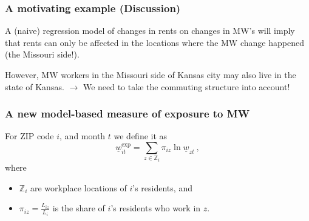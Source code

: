 \documentclass[aspectratio=169, t]{beamer}
\newcommand{\MW}{\underline{w}}
\begin{document}
\begin{frame}
    \frametitle{A motivating example (Discussion)}
    A (naive) regression model of changes in rents on changes in MW's will imply that rents can only be affected 
    in the locations where the MW change happened (the Missouri side!). 
    
    \pause
    \vspace{3mm}
    
    However, MW workers in the Missouri side of Kansas city may also live in the state of Kansas. $\to$ 
    We need to take the commuting structure into account! 
\end{frame}

\begin{frame}
    \frametitle{A new model-based measure of exposure to MW}

    For ZIP code $i$, and month $t$ we define it as
	$$
	\MW^{\text{exp}}_{it} = 
	\sum_{z \in \mathbb{Z}_i} \pi_{i z} \ln \MW_{zt} \ ,
	$$
	\vspace{-2.5mm}
	where
	\vspace{1mm}
	\begin{itemize} \small
		\item $\mathbb{Z}_i$ are workplace locations of $i$'s residents, and
		\item $\pi_{i z} = \frac{L_{i z}}{L_i}$ is the share of $i$'s residents who work 
		in $z$.
	\end{itemize}
\end{frame}
\end{document}
